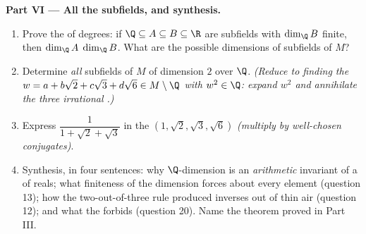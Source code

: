 \begin{problem}
\medskip
\noindent\textbf{Part VI --- All the subfields, and synthesis.}
\begin{enumerate}[resume]
  \item Prove the  of degrees: if $\Q \subseteq A
        \subseteq B \subseteq \R$ are subfields with $\dim_\Q B$
        finite, then $\dim_\Q A$  $\dim_\Q B$. What are
        the possible dimensions of subfields of $M$?
  \item Determine \emph{all} subfields of $M$ of dimension $2$
        over $\Q$. \emph{(Reduce to finding the $w = a + b\sqrt2
        + c\sqrt3 + d\sqrt6 \in M \setminus \Q$ with $w^2 \in
        \Q$: expand $w^2$ and annihilate the three irrational
        .)}
  \item Express $\dfrac1{1 + \sqrt2 + \sqrt3}$ in the  $(1,
        \sqrt2, \sqrt3, \sqrt6)$ \emph{(multiply by well-chosen
        conjugates)}.
  \item Synthesis, in four sentences: why $\Q$-dimension is an
        \emph{arithmetic} invariant of a  of reals; what
        finiteness of the dimension forces about every element
        (question 13); how the two-out-of-three rule produced
        inverses out of thin air (question 12); and what the
         forbids (question 20). Name the theorem proved
        in Part III.
\end{enumerate}
\end{problem}
